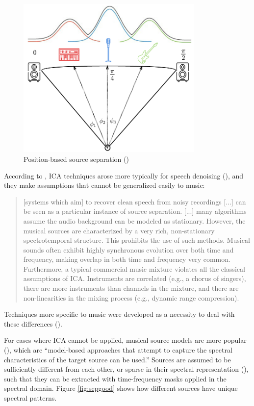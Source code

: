 \documentclass[report.tex]{subfiles}
\begin{document}
\begin{figure}[ht]
	\centering
	\includegraphics[height=8cm]{./images-mss/positional.png}
	\caption{Position-based source separation (\cite{musicsepgood})}
\label{fig:icaposition}
\end{figure}

According to \textcite{musicsepintro1}, ICA techniques arose more typically for speech denoising (\cite{speechsep}), and they make assumptions that cannot be generalized easily to music:

\begin{quote}
	[systems which aim] to recover clean speech from noisy recordings [...] can be seen as a particular instance of source separation. [...] many algorithms assume the audio background can be modeled as stationary. However, the musical sources are characterized by a very rich, non-stationary spectrotemporal structure. This prohibits the use of such methods. Musical sounds often exhibit highly synchronous evolution over both time and frequency, making overlap in both time and frequency very common. Furthermore, a typical commercial music mixture violates all the classical assumptions of ICA. Instruments are correlated (e.g., a chorus of singers), there are more instruments than channels in the mixture, and there are non-linearities in the mixing process (e.g., dynamic range compression).
\end{quote}

Techniques more specific to music were developed as a necessity to deal with these differences (\cite{musicseptechniques1, musicseptechniques2}).

For cases where ICA cannot be applied, musical source models are more popular (\cite{musicsepgood}), which are ``model-based approaches that attempt to capture the spectral characteristics of the target source can be used.'' Sources are assumed to be sufficiently different from each other, or sparse in their spectral representation (\cite{musicsepgood}), such that they can be extracted with time-frequency masks applied in the spectral domain. Figure \ref{fig:sepgood} shows how different sources have unique spectral patterns.
\end{document}

